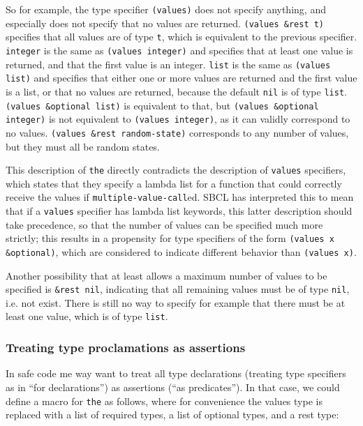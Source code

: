 \documentclass{article}
\begin{document}
So for example, the type specifier \texttt{(values)} does not specify anything, and especially does not specify that no values are returned. \texttt{(values \&rest t)} specifies that all values are of type \texttt{t}, which is equivalent to the previous specifier. \texttt{integer} is the same as \texttt{(values integer)} and specifies that at least one value is returned, and that the first value is an integer. \texttt{list} is the same as \texttt{(values list)} and specifies that either one or more values are returned and the first value is a list, or that no values are returned, because the default \texttt{nil} is of type \texttt{list}. \texttt{(values \&optional list)} is equivalent to that, but \texttt{(values \&optional integer)} is not equivalent to \texttt{(values integer)}, as it can validly correspond to no values. \texttt{(values \&rest random-state)} corresponds to any number of values, but they must all be random states.

This description of \texttt{the} directly contradicts the description of \texttt{values} specifiers, which states that they specify a lambda list for a function that could correctly receive the values if \texttt{multiple-value-call}ed. SBCL has interpreted this to mean that if a \texttt{values} specifier has lambda list keywords, this latter description should take precedence, so that the number of values can be specified much more strictly; this results in a propensity for type specifiers of the form \texttt{(values x \&optional)}, which are considered to indicate different behavior than \texttt{(values x)}.

Another possibility that at least allows a maximum number of values to be specified is \texttt{\&rest nil}, indicating that all remaining values must be of type \texttt{nil}, i.e. not exist. There is still no way to specify for example that there must be at least one value, which is of type \texttt{list}.


\subsubsection{Treating type proclamations as assertions}

In safe code me way want to treat all type declarations (treating type specifiers as in ``for declarations'') as assertions (``as predicates''). In that case, we could define a macro for \texttt{the} as follows, where for convenience the values type is replaced with a list of required types, a list of optional types, and a rest type:
\end{document}
